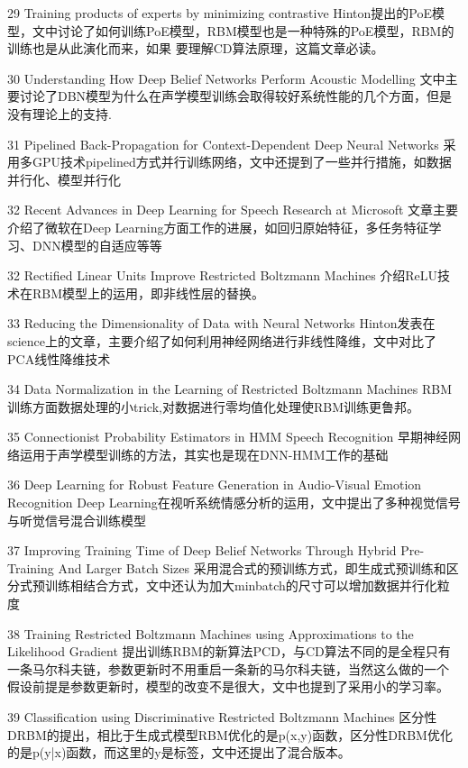 29 Training products of experts by minimizing contrastive
   Hinton提出的PoE模型，文中讨论了如何训练PoE模型，RBM模型也是一种特殊的PoE模型，RBM的训练也是从此演化而来，如果
   要理解CD算法原理，这篇文章必读。

30 Understanding How Deep Belief Networks Perform Acoustic Modelling
   文中主要讨论了DBN模型为什么在声学模型训练会取得较好系统性能的几个方面，但是没有理论上的支持.

31 Pipelined Back-Propagation for Context-Dependent Deep Neural Networks
   采用多GPU技术pipelined方式并行训练网络，文中还提到了一些并行措施，如数据并行化、模型并行化

32 Recent Advances in Deep Learning for Speech Research at Microsoft
   文章主要介绍了微软在Deep Learning方面工作的进展，如回归原始特征，多任务特征学习、DNN模型的自适应等等

32 Rectified Linear Units Improve Restricted Boltzmann Machines
   介绍ReLU技术在RBM模型上的运用，即非线性层的替换。

33 Reducing the Dimensionality of Data with Neural Networks
   Hinton发表在science上的文章，主要介绍了如何利用神经网络进行非线性降维，文中对比了PCA线性降维技术

34 Data Normalization in the Learning of Restricted Boltzmann Machines
   RBM训练方面数据处理的小trick,对数据进行零均值化处理使RBM训练更鲁邦。

35 Connectionist Probability Estimators in HMM Speech Recognition
   早期神经网络运用于声学模型训练的方法，其实也是现在DNN-HMM工作的基础

36 Deep Learning for Robust Feature Generation in Audio-Visual Emotion Recognition
   Deep Learning在视听系统情感分析的运用，文中提出了多种视觉信号与听觉信号混合训练模型

37 Improving Training Time of Deep Belief Networks Through Hybrid Pre-Training And Larger Batch Sizes
   采用混合式的预训练方式，即生成式预训练和区分式预训练相结合方式，文中还认为加大minbatch的尺寸可以增加数据并行化粒度

38 Training Restricted Boltzmann Machines using Approximations to the Likelihood Gradient
   提出训练RBM的新算法PCD，与CD算法不同的是全程只有一条马尔科夫链，参数更新时不用重启一条新的马尔科夫链，当然这么做的一个
   假设前提是参数更新时，模型的改变不是很大，文中也提到了采用小的学习率。

39 Classification using Discriminative Restricted Boltzmann Machines
   区分性DRBM的提出，相比于生成式模型RBM优化的是p(x,y)函数，区分性DRBM优化的是p(y|x)函数，而这里的y是标签，文中还提出了混合版本。

